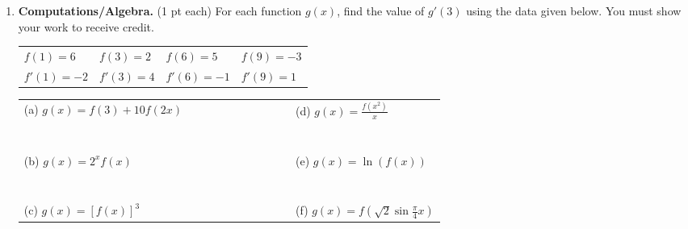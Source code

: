 \documentclass[11pt,letterpaper]{article}
\begin{document}
\begin{enumerate}
\pagebreak
\item \textbf{Computations/Algebra.} (1 pt each)  For each function $g(x)$, find the value of $g'(3)$ using the data given below. You must show your work to receive credit.
\begin{center}
\begin{tabular}{l l l l}
$f(1)=6$ & $f(3)=2$ & $f(6)=5$ & $f(9)=-3$ \\
$f'(1)=-2$ & $f'(3)=4$ & $f'(6)=-1$ & $f'(9)=1$ \\
\end{tabular}
\end{center}
\vskip 3pt
\begin{tabular}{l c c c c c c c c c l}
(a) $g(x) = f(3) + 10f(2x)$ & & & & & & & & & & (d)
$g(x) = \frac{f(x^2)}{x}$ \\
& \\
& \\
& \\
& \\
& \\
& \\
& \\
(b) $g(x) = 2^x f(x)$ & & & & & & & & & & (e) $g(x) =
\ln (f(x))$ \\
& \\
& \\
& \\
& \\
& \\
& \\
& \\
(c) $g(x) = [f(x)]^3$ & & & & & & & & & & (f) $g(x) =
f(\sqrt{2} \sin \frac{\pi}{4}x)$ \\
\end{tabular}

\end{enumerate}


\vspace{1pc}
\end{document}
